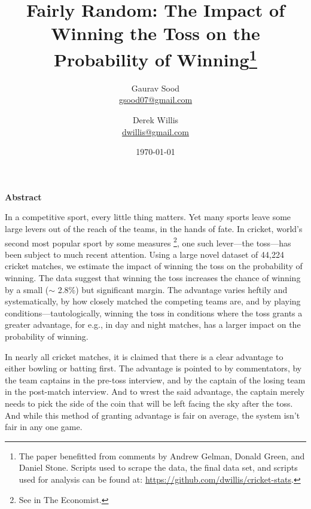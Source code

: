 \documentclass[12pt]{article}
\begin{document}
\title{\vspace{-.5cm}\normalsize{Fairly Random: The Impact of Winning the Toss on the Probability of Winning\footnote{The paper benefitted from comments by Andrew Gelman, Donald Green, and Daniel Stone. Scripts used to scrape the data, the final data set, and scripts used for analysis can be found at: \href{https://github.com/dwillis/cricket-stats}{https://github.com/dwillis/cricket-stats}. }\vspace{.5cm}}}
\author{\normalsize{Gaurav Sood}\\\href{mailto:gsood07@gmail.com}{\small{gsood07@gmail.com}} \and \normalsize{Derek Willis}\\\href{mailto:dwillis@gmail.com}{\small{dwillis@gmail.com}}}
\date{\vspace{.5cm}\normalsize{\today}}
\maketitle
\doublespacing

\begin{center}\textbf{Abstract}\\\end{center}
In a competitive sport, every little thing matters. Yet many sports leave some large levers out of the reach of the teams, in the hands of fate. In cricket, world's second most popular sport by some measures \footnote{See \citet{Economist2011} in The Economist.}, one such lever---the toss---has been subject to much recent attention. Using a large novel dataset of 44,224 cricket matches, we estimate the impact of winning the toss on the probability of winning. The data suggest that winning the toss increases the chance of winning by a small ($\sim$ 2.8\%) but significant margin. The advantage varies heftily and systematically, by how closely matched the competing teams are, and by playing conditions---tautologically, winning the toss in conditions where the toss grants a greater advantage, for e.g., in day and night matches, has a larger impact on the probability of winning.  
\clearpage

In nearly all cricket matches, it is claimed that there is a clear advantage to either bowling or batting first. The advantage is pointed to by commentators, by the team captains in the pre-toss interview, and by the captain of the losing team in the post-match interview. And to wrest the said advantage, the captain merely needs to pick the side of the coin that will be left facing the sky after the toss. And while this method of granting advantage is fair on average, the system isn't fair in any one game. 
\end{document}
